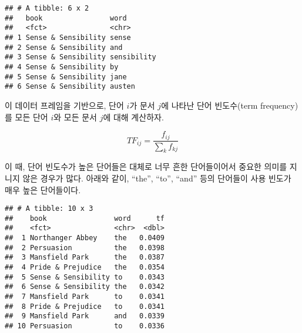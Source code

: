 \documentclass[]{book}
\newenvironment{Shaded}{\begin{snugshade}}{\end{snugshade}}
\newcommand{\DataTypeTok}[1]{\textcolor[rgb]{0.13,0.29,0.53}{#1}}
\newcommand{\DecValTok}[1]{\textcolor[rgb]{0.00,0.00,0.81}{#1}}
\newcommand{\KeywordTok}[1]{\textcolor[rgb]{0.13,0.29,0.53}{\textbf{#1}}}
\newcommand{\NormalTok}[1]{#1}
\newcommand{\OperatorTok}[1]{\textcolor[rgb]{0.81,0.36,0.00}{\textbf{#1}}}
\newcommand{\StringTok}[1]{\textcolor[rgb]{0.31,0.60,0.02}{#1}}
\begin{document}
\begin{verbatim}
## # A tibble: 6 x 2
##   book                word       
##   <fct>               <chr>      
## 1 Sense & Sensibility sense      
## 2 Sense & Sensibility and        
## 3 Sense & Sensibility sensibility
## 4 Sense & Sensibility by         
## 5 Sense & Sensibility jane       
## 6 Sense & Sensibility austen
\end{verbatim}

이 데이터 프레임을 기반으로, 단어 \(i\)가 문서 \(j\)에 나타난 단어 빈도수(term frequency)를 모든 단어 \(i\)와 모든 문서 \(j\)에 대해 계산하자.

\begin{equation*}
TF_{ij} = \frac{f_{ij}}{\sum_k f_{kj}}
\end{equation*}

\begin{Shaded}
\end{Shaded}

이 때, 단어 빈도수가 높은 단어들은 대체로 너무 흔한 단어들이어서 중요한 의미를 지니지 않은 경우가 많다. 아래와 같이, ``the'', ``to'', ``and'' 등의 단어들이 사용 빈도가 매우 높은 단어들이다.

\begin{Shaded}
\end{Shaded}

\begin{verbatim}
## # A tibble: 10 x 3
##    book                word      tf
##    <fct>               <chr>  <dbl>
##  1 Northanger Abbey    the   0.0409
##  2 Persuasion          the   0.0398
##  3 Mansfield Park      the   0.0387
##  4 Pride & Prejudice   the   0.0354
##  5 Sense & Sensibility to    0.0343
##  6 Sense & Sensibility the   0.0342
##  7 Mansfield Park      to    0.0341
##  8 Pride & Prejudice   to    0.0341
##  9 Mansfield Park      and   0.0339
## 10 Persuasion          to    0.0336
\end{verbatim}
\end{document}
